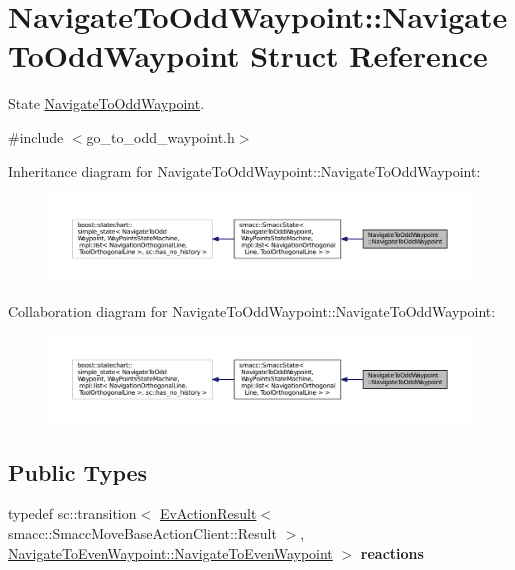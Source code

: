 \hypertarget{structNavigateToOddWaypoint_1_1NavigateToOddWaypoint}{}\section{Navigate\+To\+Odd\+Waypoint\+:\+:Navigate\+To\+Odd\+Waypoint Struct Reference}
\label{structNavigateToOddWaypoint_1_1NavigateToOddWaypoint}


State \hyperlink{structNavigateToOddWaypoint_1_1NavigateToOddWaypoint}{Navigate\+To\+Odd\+Waypoint}.  




{\ttfamily \#include $<$go\+\_\+to\+\_\+odd\+\_\+waypoint.\+h$>$}



Inheritance diagram for Navigate\+To\+Odd\+Waypoint\+:\+:Navigate\+To\+Odd\+Waypoint\+:
\nopagebreak
\begin{figure}[H]
\begin{center}
\leavevmode
\includegraphics[width=350pt]{structNavigateToOddWaypoint_1_1NavigateToOddWaypoint__inherit__graph}
\end{center}
\end{figure}


Collaboration diagram for Navigate\+To\+Odd\+Waypoint\+:\+:Navigate\+To\+Odd\+Waypoint\+:
\nopagebreak
\begin{figure}[H]
\begin{center}
\leavevmode
\includegraphics[width=350pt]{structNavigateToOddWaypoint_1_1NavigateToOddWaypoint__coll__graph}
\end{center}
\end{figure}
\subsection*{Public Types}
\begin{DoxyCompactItemize}
\item 
typedef sc\+::transition$<$ \hyperlink{structsmacc_1_1EvActionResult}{Ev\+Action\+Result}$<$ smacc\+::\+Smacc\+Move\+Base\+Action\+Client\+::\+Result $>$, \hyperlink{structNavigateToEvenWaypoint_1_1NavigateToEvenWaypoint}{Navigate\+To\+Even\+Waypoint\+::\+Navigate\+To\+Even\+Waypoint} $>$ {\bfseries reactions}\hypertarget{structNavigateToOddWaypoint_1_1NavigateToOddWaypoint_a23bbe6ff0cf5fedf9db62498a75e0cea}{}\label{structNavigateToOddWaypoint_1_1NavigateToOddWaypoint_a23bbe6ff0cf5fedf9db62498a75e0cea}

\end{DoxyCompactItemize}
